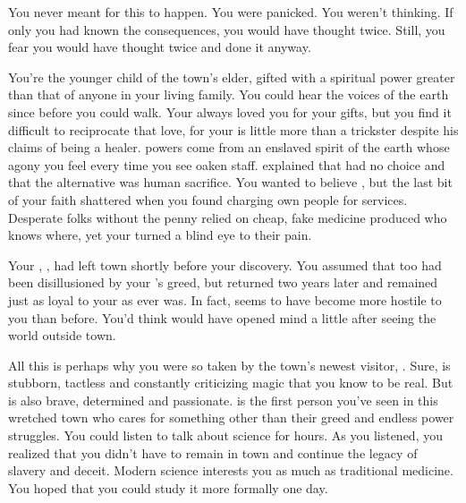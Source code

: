 \documentclass[char]{Pestilence}
\begin{document}
\name{\cRebel{}}

You never meant for this to happen. You were panicked. You weren't thinking. If only you had known the consequences, you would have thought twice. Still, you fear you would have thought twice and done it anyway.

You're the younger child of the town's elder, gifted with a spiritual power greater than that of anyone in your living family. You could hear the voices of the earth since before you could walk. Your \cElder{\parent} always loved you for your gifts, but you find it difficult to reciprocate that love, for your \cElder{\parent} is little more than a trickster despite his claims of being a healer. \cElder{\Their} powers come from an enslaved spirit of the earth whose agony you feel every time you see \cElder{\their} oaken staff. \cElder{\They} explained that \cElder{\they} had no choice and that the alternative was human sacrifice. You wanted to believe \cElder{\them}, but the last bit of your faith shattered when you found \cElder{\them} charging \cElder{\their} own people for \cElder{\their} services. Desperate folks without the penny relied on cheap, fake medicine produced who knows where, yet your \cElder{\parent} turned a blind eye to their pain.

Your \cApprentice{\sibling}, \cApprentice{}, had left town shortly before your discovery. You assumed that \cApprentice{\they} too had been disillusioned by your \cElder{\parent}'s greed, but \cApprentice{\they} returned two years later and remained just as loyal to your \cElder{\parent} as \cApprentice{\they} ever was. In fact, \cApprentice{\they} seems to have become more hostile to you than before. You'd think \cApprentice{} would have opened \cApprentice{\their} mind a little after seeing the world outside town.   

All this is perhaps why you were so taken by the town's newest visitor, \cOutsider{\intro}. Sure, \cOutsider{\they} is stubborn, tactless and constantly criticizing magic that you know to be real. But \cOutsider{\they} is also brave, determined and passionate. \cOutsider{\They} is the first person you've seen in this wretched town who cares for something other than their greed and endless power struggles. You could listen to \cOutsider{\them} talk about \cOutsider{\their} science for hours. As you listened, you realized that you didn't have to remain in town and continue the legacy of slavery and deceit. Modern science interests you as much as traditional medicine. You hoped that you could study it more formally one day.
\end{document}
